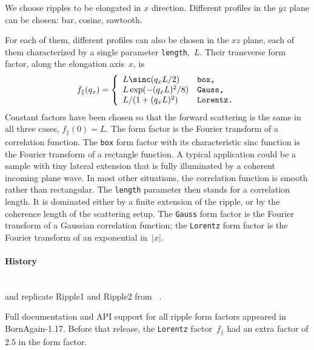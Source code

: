 We choose ripples to be elongated in $x$ direction.
Different profiles in the $yz$ plane can be chosen:
bar, cosine, sawtooth.

For each of them, different profiles can also be chosen in the $xz$ plane,
each of them characterized by a single parameter \texttt{length},~$L$.
Their transverse form factor,
%
along the elongation axis~$x$, is
\begin{equation}\label{EFparallel}
    f_\parallel(q_x) = \left\{\begin{array}{l@{\quad}l}
    L\sinc(q_x L/2) &\texttt{box,}\\
    L\exp(-(q_x L)^2/8) &\texttt{Gauss,}\\
    L/(1+(q_x L)^2) &\texttt{Lorentz.}
    \end{array}\right.
\end{equation}
Constant factors have been chosen so that the forward scattering is the same
in all three cases, $f_\parallel(0)=L$.
The form factor is the Fourier transform of a correlation function.
The \texttt{box} form factor with its characteristic sinc function
is the Fourier transform of a rectangle function.
A typical application could be a sample with tiny lateral extension
that is fully illuminated by a coherent incoming plane wave.
In most other situations, the correlation function is smooth rather than rectangular.
The \texttt{length} parameter then stands for a correlation length.
%
It is dominated either by a finite extension of the ripple,
or by the coherence length
%
of the scattering setup.
The \texttt{Gauss} form factor is the Fourier transform of
a Gaussian
correlation function;
the \texttt{Lorentz}
 form factor is the Fourier transform of an exponential in~$|x|$.

\paragraph{History}\strut\\
 and  replicate
Ripple1 and Ripple2 from \FitGISAXS\ \cite{Bab13}.

Full documentation and API support for all ripple form factors appeared in BornAgain-1.17.
Before that release, the \texttt{Lorentz} factor~$f_\parallel$
had an extra factor of 2.5 in the form factor.


 \label{SBar}

